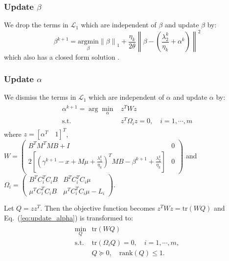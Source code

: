 \documentclass[10pt,twocolumn,letterpaper]{article}
\begin{document}
\subsubsection{Update $\beta$}
We drop the terms in $\mathcal{L}_1$ which are independent of
$\beta$ and update $\beta$ by:
\begin{equation*}
\beta^{k+1} = \underset{\beta}{\text{argmin}}{\left\| \beta
\right\|_1+\frac{\eta_k}{2 \theta} \left\|
\beta-\left(\frac{\lambda_2^k}{\eta_k}+\alpha^k\right) \right\|^2}
\label{eq:update_beta}
\end{equation*}
which also has a closed form solution \cite{liu2013linearized}.


\subsubsection{Update $\alpha$}
We dismiss the terms in $\mathcal{L}_1$ which are independent of
$\alpha$ and update $\alpha$ by:
\begin{eqnarray}
\begin{array}{rl}
\alpha^{k+1} =  \arg\min\limits_{\alpha}
& {z^T W z } \\
\mbox{s.t.} & z^T \Omega_i z = 0, \quad i=1,\cdots,m
\end{array}\label{eq:update_alpha}
\end{eqnarray}
where  $z=[\alpha^T \quad 1]^T$, \\
$W\!\!=\!\!\left(  \begin{array}{cc}
B^T M^T M B + I & 0 \\
\!\!\!\!2 \left[ \left( \gamma^{k+1}-x+M \mu +
\frac{\lambda_1^k}{\eta_k} \right)^T M B - \beta^{k+1} +
\frac{\lambda_2^k}{\eta_k} \right] & 0
\end{array} \right)$
and $\Omega_i=\left( \begin{array}{cc}
B^T C_i^T C_i B & B^T C_i^T C_i \mu \\
\mu^T C_i^T C_i B & \mu^T C_i^T C_i \mu - L_i
\end{array} \right)$.

Let $Q=z z^T$. Then the objective function becomes $z^T W
z=\mbox{tr}(WQ)$ and Eq.~(\ref{eq:update_alpha}) is transformed
to:
\begin{eqnarray}
\begin{array}{rl}
\underset{Q}{\text{min}}
& {\mbox{tr}(W Q)} \\
\mbox{s.t.}
& \mbox{tr}(\Omega_i Q) = 0, \quad i=1,\cdots,m, \\
& Q \succeq 0, \quad \mbox{rank}(Q) \leq 1.
\end{array}\label{eq:update_alpha2}
\end{eqnarray}
\end{document}
